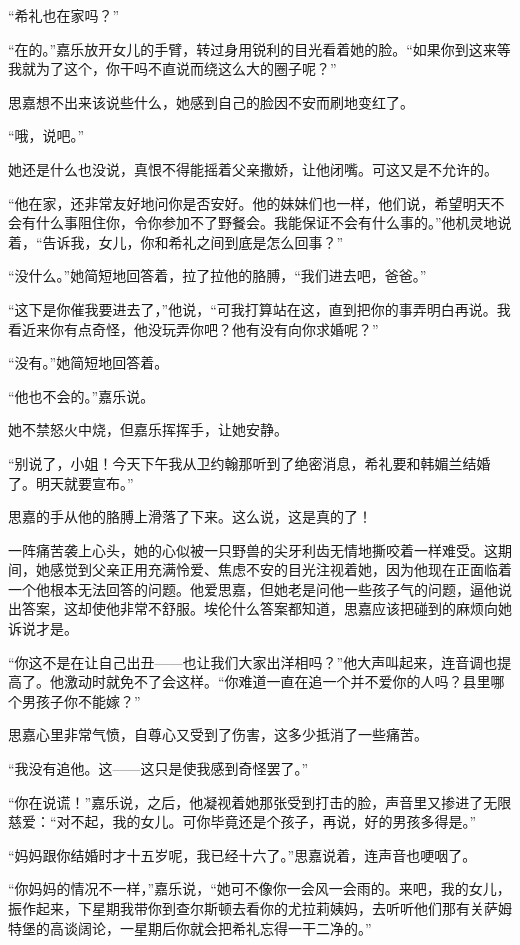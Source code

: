 \par “希礼也在家吗？”
\par “在的。”嘉乐放开女儿的手臂，转过身用锐利的目光看着她的脸。“如果你到这来等我就为了这个，你干吗不直说而绕这么大的圈子呢？”
\par 思嘉想不出来该说些什么，她感到自己的脸因不安而刷地变红了。
\par “哦，说吧。”
\par 她还是什么也没说，真恨不得能摇着父亲撒娇，让他闭嘴。可这又是不允许的。
\par “他在家，还非常友好地问你是否安好。他的妹妹们也一样，他们说，希望明天不会有什么事阻住你，令你参加不了野餐会。我能保证不会有什么事的。”他机灵地说着，“告诉我，女儿，你和希礼之间到底是怎么回事？”
\par “没什么。”她简短地回答着，拉了拉他的胳膊，“我们进去吧，爸爸。”
\par “这下是你催我要进去了，”他说，“可我打算站在这，直到把你的事弄明白再说。我看近来你有点奇怪，他没玩弄你吧？他有没有向你求婚呢？”
\par “没有。”她简短地回答着。
\par “他也不会的。”嘉乐说。
\par 她不禁怒火中烧，但嘉乐挥挥手，让她安静。
\par “别说了，小姐！今天下午我从卫约翰那听到了绝密消息，希礼要和韩媚兰结婚了。明天就要宣布。”
\par 思嘉的手从他的胳膊上滑落了下来。这么说，这是真的了！
\par 一阵痛苦袭上心头，她的心似被一只野兽的尖牙利齿无情地撕咬着一样难受。这期间，她感觉到父亲正用充满怜爱、焦虑不安的目光注视着她，因为他现在正面临着一个他根本无法回答的问题。他爱思嘉，但她老是问他一些孩子气的问题，逼他说出答案，这却使他非常不舒服。埃伦什么答案都知道，思嘉应该把碰到的麻烦向她诉说才是。
\par “你这不是在让自己出丑——也让我们大家出洋相吗？”他大声叫起来，连音调也提高了。他激动时就免不了会这样。“你难道一直在追一个并不爱你的人吗？县里哪个男孩子你不能嫁？”
\par 思嘉心里非常气愤，自尊心又受到了伤害，这多少抵消了一些痛苦。
\par “我没有追他。这——这只是使我感到奇怪罢了。”
\par “你在说谎！”嘉乐说，之后，他凝视着她那张受到打击的脸，声音里又掺进了无限慈爱：“对不起，我的女儿。可你毕竟还是个孩子，再说，好的男孩多得是。”
\par “妈妈跟你结婚时才十五岁呢，我已经十六了。”思嘉说着，连声音也哽咽了。
\par “你妈妈的情况不一样，”嘉乐说，“她可不像你一会风一会雨的。来吧，我的女儿，振作起来，下星期我带你到查尔斯顿去看你的尤拉莉姨妈，去听听他们那有关萨姆特堡的高谈阔论，一星期后你就会把希礼忘得一干二净的。”
